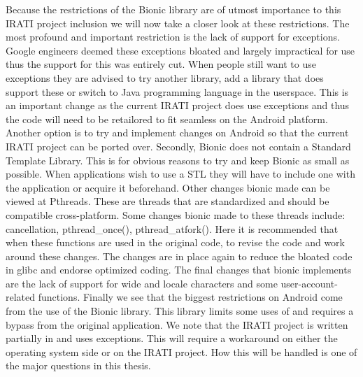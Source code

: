 \npar
Because the \cpp restrictions of the Bionic library are of utmost importance to this IRATI project inclusion we will now take a closer look at these restrictions. The most profound and important restriction is the lack of support for \cpp exceptions. Google engineers deemed these exceptions bloated and largely impractical for use thus the support for this was entirely cut. When people still want to use exceptions they are advised to try another library, add a library that does support these or switch to Java programming language in the userspace. This is an important change as the current IRATI project does use \cpp exceptions and thus the code will need to be retailored to fit seamless on the Android platform. Another option is to try and implement changes on Android so that the current IRATI project can be ported over. Secondly, Bionic does not contain a \cpp Standard Template Library. This is for obvious reasons to try and keep Bionic as small as possible. When applications wish to use a \cpp STL they will have to include one with the application or acquire it beforehand. Other changes bionic made can be viewed at Pthreads. These are threads that are standardized and should be compatible cross-platform. Some changes bionic made to these threads include: cancellation, pthread\_once(), pthread\_atfork(). Here it is recommended that when these functions are used in the original code, to revise the code and work around these changes. The changes are in place again to reduce the bloated code in glibc and endorse optimized coding. The final changes that bionic implements are the lack of support for wide and locale characters and some user-account-related functions. 
\npar
Finally we see that the biggest restrictions on Android come from the use of the Bionic library. This library limits some uses of \cpp and requires a bypass from the original application. We note that the IRATI project is written partially in \cpp and uses exceptions. This will require a workaround on either the operating system side or on the IRATI project. How this will be handled is one of the major questions in this thesis. 